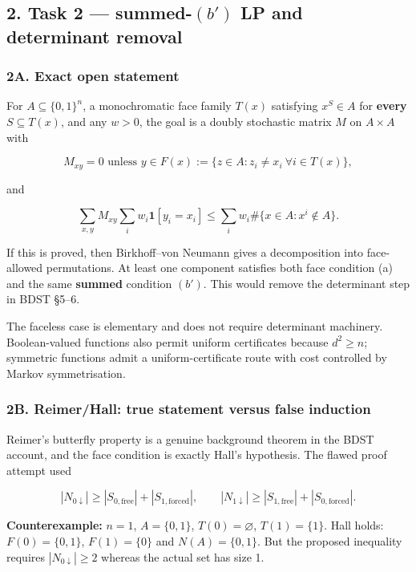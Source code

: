 \subsection{\texorpdfstring{2. Task 2 --- summed-\((b')\) LP and determinant removal}{2. Task 2 --- summed-(b\textquotesingle) LP and determinant removal}}\label{task-2-summed-b-lp-and-determinant-removal}

\subsubsection{2A. Exact open statement}\label{a.-exact-open-statement}

For \(A\subseteq\{0,1\}^n\), a monochromatic face family \(T(x)\) satisfying \(x^S\in A\) for \textbf{every} \(S\subseteq T(x)\), and any \(w>0\), the goal is a doubly stochastic matrix \(M\) on \(A\times A\) with

\[M_{xy}=0\text{ unless }y\in F(x):=\{z\in A:z_i\ne x_i\ \forall i\in T(x)\},\]

and

\[\sum_{x,y}M_{xy}\sum_iw_i\mathbf1[y_i=x_i]
\le\sum_iw_i\#\{x\in A:x^i\notin A\}.\]

If this is proved, then Birkhoff--von Neumann gives a decomposition into face-allowed permutations. At least one component satisfies both face condition (a) and the same \textbf{summed} condition \((b')\). This would remove the determinant step in BDST §5--6.

The faceless case is elementary and does not require determinant machinery. Boolean-valued functions also permit uniform certificates because \(d^2\ge n\); symmetric functions admit a uniform-certificate route with cost controlled by Markov symmetrisation.

\subsubsection{2B. Reimer/Hall: true statement versus false induction}\label{b.-reimerhall-true-statement-versus-false-induction}

Reimer's butterfly property is a genuine background theorem in the BDST account, and the face condition is exactly Hall's hypothesis. The flawed proof attempt used

\[|N_{0\downarrow}|\ge|S_{0,\mathrm{free}}|+|S_{1,\mathrm{forced}}|,\qquad
|N_{1\downarrow}|\ge|S_{1,\mathrm{free}}|+|S_{0,\mathrm{forced}}|.\]

\textbf{Counterexample:} \(n=1\), \(A=\{0,1\}\), \(T(0)=\varnothing\), \(T(1)=\{1\}\). Hall holds: \(F(0)=\{0,1\}\), \(F(1)=\{0\}\) and \(N(A)=\{0,1\}\). But the proposed inequality requires \(|N_{0\downarrow}|\ge2\) whereas the actual set has size 1.

